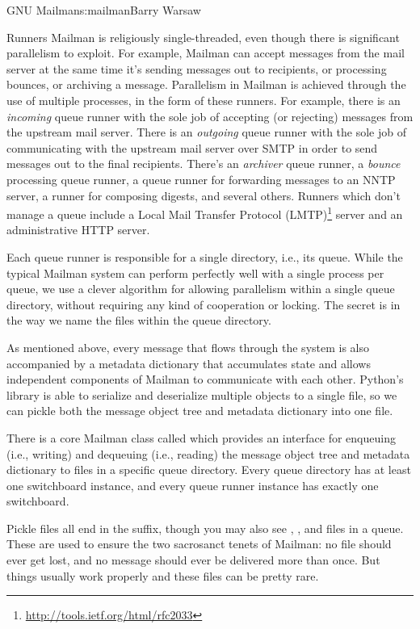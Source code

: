 \begin{aosachapter}{GNU Mailman}{s:mailman}{Barry Warsaw}
\begin{aosasect1}{Runners}
Mailman is religiously single-threaded, even though there is
significant parallelism to exploit.  For example, Mailman can accept
messages from the mail server at the same time it's sending messages
out to recipients, or processing bounces, or archiving a message.
Parallelism in Mailman is achieved through the use of multiple
processes, in the form of these runners.  For example, there is an
\emph{incoming} queue runner with the sole job of accepting (or
rejecting) messages from the upstream mail server.  There is an
\emph{outgoing} queue runner with the sole job of communicating with
the upstream mail server over SMTP in order to send messages out to
the final recipients.  There's an \emph{archiver} queue runner, a
\emph{bounce} processing queue runner, a queue runner for forwarding
messages to an NNTP server, a runner for composing digests, and
several others.  Runners which don't manage a queue include a Local
Mail Transfer Protocol
(LMTP)\footnote{\url{http://tools.ietf.org/html/rfc2033}} server and
an administrative HTTP server.

Each queue runner is responsible for a single directory, i.e., its
queue.  While the typical Mailman system can perform perfectly
well with a single process per queue, we use a clever algorithm for
allowing parallelism within a single queue directory, without
requiring any kind of cooperation or locking.  The secret is in the
way we name the files within the queue directory.

As mentioned above, every message that flows through the system is
also accompanied by a metadata dictionary that accumulates state and
allows independent components of Mailman to communicate with each
other.  Python's  library is able to serialize and
deserialize multiple objects to a single file, so we can pickle both
the message object tree and metadata dictionary into one file.

There is a core Mailman class called  which provides
an interface for enqueuing (i.e., writing) and dequeuing (i.e.,
reading) the message object tree and metadata dictionary to files in a
specific queue directory.  Every queue directory has at least one
switchboard instance, and every queue runner instance has exactly one
switchboard.

Pickle files all end in the  suffix, though you may also
see , , and  files in a queue.  These
are used to ensure the two sacrosanct tenets of Mailman: no file
should ever get lost, and no message should ever be delivered more
than once.  But things usually work properly and these files can be
pretty rare.


\end{aosasect1}
\end{aosachapter}
